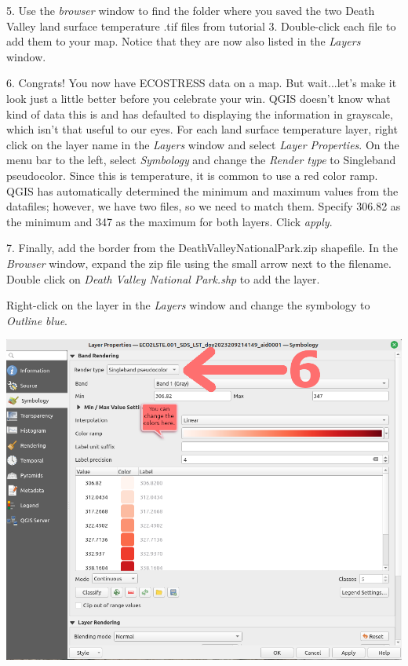 \documentclass[oneside,a4paper,11pt,explicit]{book}
\begin{document}
\vspace{1em}

5. Use the \textit{browser} window to find the folder where you saved the two Death Valley land surface temperature .tif files from tutorial 3. Double-click each file to add them to your map. Notice that they are now also listed in the \textit{Layers} window.

6. Congrats! You now have ECOSTRESS data on a map. But wait...let's make it look just a little better before you celebrate your win. QGIS doesn't know what kind of data this is and has defaulted to displaying the information in grayscale, which isn't that useful to our eyes. For each land surface temperature layer, right click on the layer name in the \textit{Layers} window and select \textit{Layer Properties}. On the menu bar to the left, select \textit{Symbology} and change the \textit{Render type} to Singleband pseudocolor. Since this is temperature, it is common to use a red color ramp. QGIS has automatically determined the minimum and maximum values from the datafiles; however, we have two files, so we need to match them. Specify 306.82 as the minimum and 347 as the maximum for both layers. Click \textit{apply}.

7. Finally, add the border from the DeathValleyNationalPark.zip shapefile. In the \textit{Browser} window, expand the zip file using the small arrow next to the filename. Double click on \textit{Death Valley National Park.shp} to add the layer. 


Right-click on the layer in the \textit{Layers} window and change the symbology to \textit{Outline
blue}. 

\vspace{1em}

\centerline{\includegraphics[width=.75\textwidth]{SymbologyLST.png}}
\end{document}
